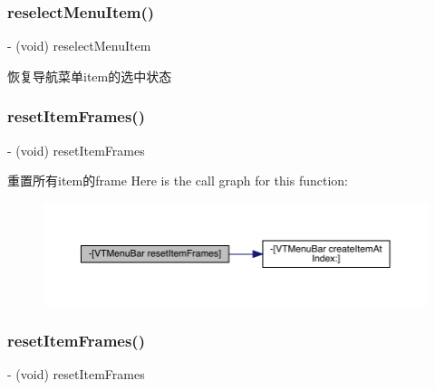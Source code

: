 \subsubsection{\texorpdfstring{reselect\+Menu\+Item()}{reselectMenuItem()}\hspace{0.1cm}{\footnotesize\ttfamily [3/3]}}
{\footnotesize\ttfamily -\/ (void) reselect\+Menu\+Item \begin{DoxyParamCaption}{ }\end{DoxyParamCaption}}

恢复导航菜单item的选中状态 \mbox{\label{interface_v_t_menu_bar_a877e09cfa864c23b222097c4ca18d377}} 
\subsubsection{\texorpdfstring{reset\+Item\+Frames()}{resetItemFrames()}\hspace{0.1cm}{\footnotesize\ttfamily [1/3]}}
{\footnotesize\ttfamily -\/ (void) reset\+Item\+Frames \begin{DoxyParamCaption}{ }\end{DoxyParamCaption}}

重置所有item的frame Here is the call graph for this function\+:\nopagebreak
\begin{figure}[H]
\begin{center}
\leavevmode
\includegraphics[width=350pt]{interface_v_t_menu_bar_a877e09cfa864c23b222097c4ca18d377_cgraph}
\end{center}
\end{figure}
\mbox{\label{interface_v_t_menu_bar_a877e09cfa864c23b222097c4ca18d377}} 
\subsubsection{\texorpdfstring{reset\+Item\+Frames()}{resetItemFrames()}\hspace{0.1cm}{\footnotesize\ttfamily [2/3]}}
{\footnotesize\ttfamily -\/ (void) reset\+Item\+Frames \begin{DoxyParamCaption}{ }\end{DoxyParamCaption}}

